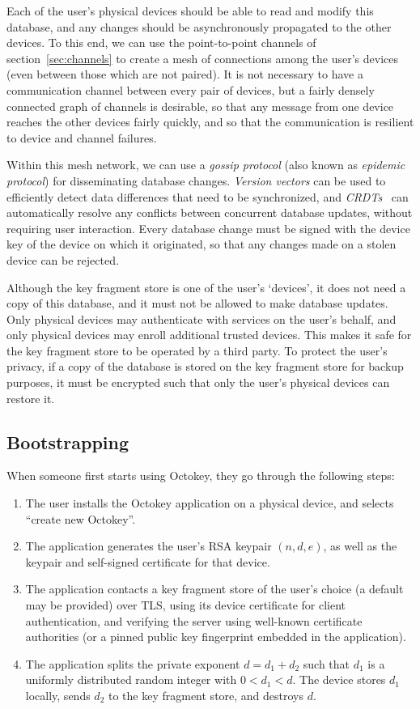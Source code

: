 Each of the user's physical devices should be able to read and modify this database, and any changes
should be asynchronously propagated to the other devices. To this end, we can use the point-to-point
channels of section~\ref{sec:channels} to create a mesh of connections among the user's devices
(even between those which are not paired). It is not necessary to have a communication channel
between every pair of devices, but a fairly densely connected graph of channels is desirable, so
that any message from one device reaches the other devices fairly quickly, and so that the
communication is resilient to device and channel failures.

Within this mesh network, we can use a \emph{gossip protocol} (also known as \emph{epidemic
protocol}) \cite{Demers89} for disseminating database changes. \emph{Version vectors}
\cite{ParkerJr83} can be used to efficiently detect data differences that need to be synchronized,
and \emph{CRDTs}~\cite{Shapiro11} can automatically resolve any conflicts between concurrent
database updates, without requiring user interaction. Every database change must be signed with the
device key of the device on which it originated, so that any changes made on a stolen device can be
rejected.

Although the key fragment store is one of the user's `devices', it does not need a copy of this
database, and it must not be allowed to make database updates. Only physical devices may
authenticate with services on the user's behalf, and only physical devices may enroll additional
trusted devices. This makes it safe for the key fragment store to be operated by a third party. To
protect the user's privacy, if a copy of the database is stored on the key fragment store for backup
purposes, it must be encrypted such that only the user's physical devices can restore it.

\subsection{Bootstrapping}\label{sec:bootstrap}

When someone first starts using Octokey, they go through the following steps:

\begin{enumerate}
\item The user installs the Octokey application on a physical device, and selects ``create new
Octokey''.
\item The application generates the user's RSA keypair $(n, d, e)$, as well as the keypair and
self-signed certificate for that device.
\item The application contacts a key fragment store of the user's choice (a default may be
provided) over TLS, using its device certificate for client authentication, and verifying the server
using well-known certificate authorities (or a pinned public key fingerprint embedded in the
application).
\item The application splits the private exponent $d = d_1 + d_2$ such that $d_1$ is a uniformly
distributed random integer with $0 < d_1 < d$. The device stores $d_1$ locally, sends $d_2$ to the
key fragment store, and destroys $d$.
\end{enumerate}

